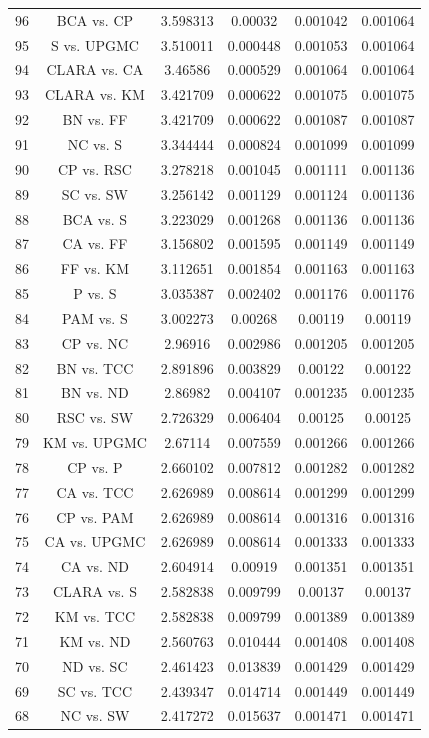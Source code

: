 \documentclass[a4paper,10pt]{article}
\begin{document}
\begin{landscape}
\begin{table}[!htp]
\begin{tabular}{cccccc}
96&BCA vs. CP&3.598313&0.00032&0.001042&0.001064\\
95&S vs. UPGMC&3.510011&0.000448&0.001053&0.001064\\
94&CLARA vs. CA&3.46586&0.000529&0.001064&0.001064\\
93&CLARA vs. KM&3.421709&0.000622&0.001075&0.001075\\
92&BN vs. FF&3.421709&0.000622&0.001087&0.001087\\
91&NC vs. S&3.344444&0.000824&0.001099&0.001099\\
90&CP vs. RSC&3.278218&0.001045&0.001111&0.001136\\
89&SC vs. SW&3.256142&0.001129&0.001124&0.001136\\
88&BCA vs. S&3.223029&0.001268&0.001136&0.001136\\
87&CA vs. FF&3.156802&0.001595&0.001149&0.001149\\
86&FF vs. KM&3.112651&0.001854&0.001163&0.001163\\
85&P vs. S&3.035387&0.002402&0.001176&0.001176\\
84&PAM vs. S&3.002273&0.00268&0.00119&0.00119\\
83&CP vs. NC&2.96916&0.002986&0.001205&0.001205\\
82&BN vs. TCC&2.891896&0.003829&0.00122&0.00122\\
81&BN vs. ND&2.86982&0.004107&0.001235&0.001235\\
80&RSC vs. SW&2.726329&0.006404&0.00125&0.00125\\
79&KM vs. UPGMC&2.67114&0.007559&0.001266&0.001266\\
78&CP vs. P&2.660102&0.007812&0.001282&0.001282\\
77&CA vs. TCC&2.626989&0.008614&0.001299&0.001299\\
76&CP vs. PAM&2.626989&0.008614&0.001316&0.001316\\
75&CA vs. UPGMC&2.626989&0.008614&0.001333&0.001333\\
74&CA vs. ND&2.604914&0.00919&0.001351&0.001351\\
73&CLARA vs. S&2.582838&0.009799&0.00137&0.00137\\
72&KM vs. TCC&2.582838&0.009799&0.001389&0.001389\\
71&KM vs. ND&2.560763&0.010444&0.001408&0.001408\\
70&ND vs. SC&2.461423&0.013839&0.001429&0.001429\\
69&SC vs. TCC&2.439347&0.014714&0.001449&0.001449\\
68&NC vs. SW&2.417272&0.015637&0.001471&0.001471\\

\end{tabular}
\end{table}
\end{landscape}
\end{document}
